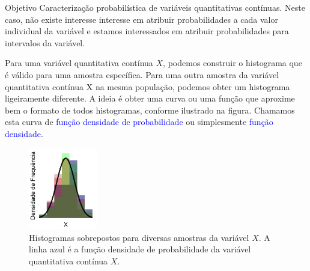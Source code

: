 \documentclass[9pt]{beamer}
\begin{document}
\begin{frame}{}

{\small
 \begin{block}{Objetivo}
  Caracterização probabilística de variáveis quantitativas contínuas. Neste caso, não existe interesse interesse em atribuir probabilidades a cada valor individual
  da variável e estamos interessados em atribuir probabilidades para intervalos da variável.
 \end{block}
% 
% 
% 
%  
%  

Para uma variável quantitativa contínua $X$, podemos construir o histograma que é válido para uma amostra específica. Para uma outra amostra da variável quantitativa contínua X na mesma população, podemos obter um histograma ligeiramente diferente. A ideia é obter uma curva ou uma função que aproxime bem o formato de todos histogramas, conforme ilustrado na figura. Chamamos esta curva de \textcolor{blue}{função densidade de probabilidade} ou simplesmente \textcolor{blue}{função densidade}. 
\begin{figure}[htbp]
	\centering
	\caption{Histogramas sobrepostos para diversas amostras da variável $X$. A linha azul é a função densidade de probabilidade da variável quantitativa contínua $X$.}
	\includegraphics[width=3cm]{figure/motivacao.png}
\end{figure}
}
\end{frame}
\end{document}
